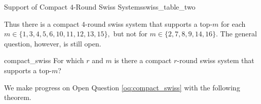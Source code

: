 {    \begin{figg}{Support of Compact $4$-Round Swiss Systems}{swiss_table_two}
        \begin{center}
        \end{center}
    \end{figg}

    Thus there is a compact $4$-round swiss system that supports a top-$m$ for each $m \in \{1, 3, 4, 5, 6, 10, 11, 12, 13, 15\},$ but not for $m \in \{2, 7, 8, 9, 14, 16\}.$ The general question, however, is still open.

    \begin{oq}{}{compact_swiss}
        For which $r$ and $m$ is there a compact $r$-round swiss system that supports a top-$m$?
    \end{oq}

    We make progress on Open Question \ref{oq:compact_swiss} with the following theorem.
    
}
